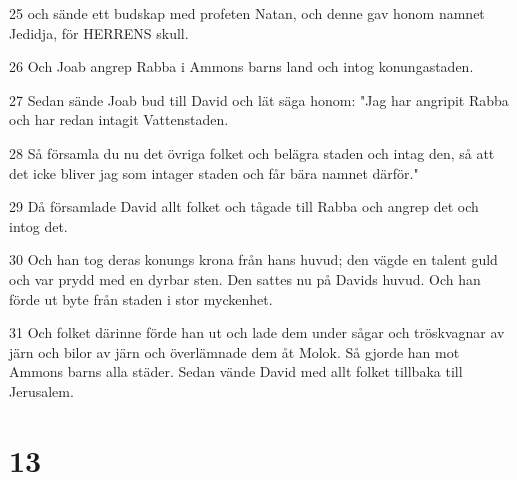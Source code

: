 \par 25 och sände ett budskap med profeten Natan, och denne gav honom namnet Jedidja, för HERRENS skull.
\par 26 Och Joab angrep Rabba i Ammons barns land och intog konungastaden.
\par 27 Sedan sände Joab bud till David och lät säga honom: "Jag har angripit Rabba och har redan intagit Vattenstaden.
\par 28 Så församla du nu det övriga folket och belägra staden och intag den, så att det icke bliver jag som intager staden och får bära namnet därför."
\par 29 Då församlade David allt folket och tågade till Rabba och angrep det och intog det.
\par 30 Och han tog deras konungs krona från hans huvud; den vägde en talent guld och var prydd med en dyrbar sten. Den sattes nu på Davids huvud. Och han förde ut byte från staden i stor myckenhet.
\par 31 Och folket därinne förde han ut och lade dem under sågar och tröskvagnar av järn och bilor av järn och överlämnade dem åt Molok. Så gjorde han mot Ammons barns alla städer. Sedan vände David med allt folket tillbaka till Jerusalem.

\chapter{13}

